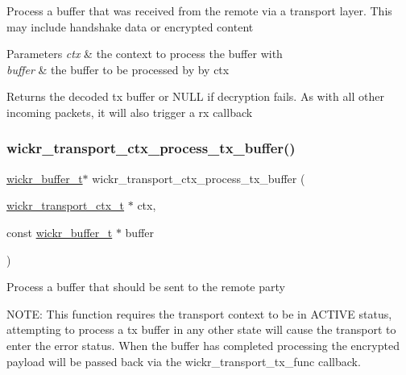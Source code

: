 Process a buffer that was received from the remote via a transport layer. This may include handshake data or encrypted content


\begin{DoxyParams}{Parameters}
{\em ctx} & the context to process the buffer with \\
\hline
{\em buffer} & the buffer to be processed by by \textquotesingle{}ctx\textquotesingle{} \\
\hline
\end{DoxyParams}
\begin{DoxyReturn}{Returns}
the decoded tx buffer or N\+U\+LL if decryption fails. As with all other incoming packets, it will also trigger a rx callback 
\end{DoxyReturn}
\mbox{\label{group__wickr__transport__ctx_ga60dad2360ba29d8c131093a4e9b69057}} 
\subsubsection{\texorpdfstring{wickr\_transport\_ctx\_process\_tx\_buffer()}{wickr\_transport\_ctx\_process\_tx\_buffer()}}
{\footnotesize\ttfamily \mbox{\hyperlink{structwickr__buffer}{wickr\+\_\+buffer\+\_\+t}}$\ast$ wickr\+\_\+transport\+\_\+ctx\+\_\+process\+\_\+tx\+\_\+buffer (\begin{DoxyParamCaption}\item[{\mbox{\hyperlink{structwickr__transport__ctx}{wickr\+\_\+transport\+\_\+ctx\+\_\+t}} $\ast$}]{ctx,  }\item[{const \mbox{\hyperlink{structwickr__buffer}{wickr\+\_\+buffer\+\_\+t}} $\ast$}]{buffer }\end{DoxyParamCaption})}

Process a buffer that should be sent to the remote party

N\+O\+TE\+: This function requires the transport context to be in A\+C\+T\+I\+VE status, attempting to process a tx buffer in any other state will cause the transport to enter the error status. When the buffer has completed processing the encrypted payload will be passed back via the wickr\+\_\+transport\+\_\+tx\+\_\+func callback.


